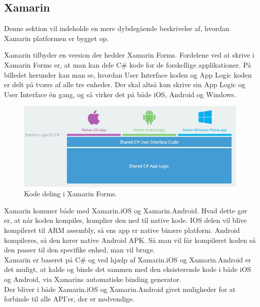 \subsection{Xamarin}
Denne sektion vil indeholde en mere dybdegående beskrivelse af, hvordan Xamarin platformen er bygget op.

Xamarin tilbyder en version der hedder Xamarin Forms. Fordelene ved at skrive i Xamarin Forms er, at man kan dele C\# kode for de forskellige applikationer.
På billedet herunder kan man se, hvordan User Interface koden og App Logic koden er delt på tværs af alle tre enheder. Der skal altså kun skrive sin App Logic og User Interface én gang, og så virker det på både iOS, Android og Windows.
\begin{figure}[H]
	\centering
	\includegraphics[width=1\linewidth]{Applikation/XarmarinShare.JPG}
	\caption{Kode deling i Xamarin Forms.\cite{Xarmain}}
	\label{fig:CodeShare}
\end{figure}

\clearpage

Xamarin kommer både med Xamarin.iOS og Xamarin.Android. Hvad dette gør er, at når koden kompiles, komplier den ned til native kode. IOS delen vil blive kompileret til ARM assembly, så ens app er native binære platform. Android kompileres, så den kører native Android APK. Så man vil får kompileret koden så den passer til den specifike enhed, man vil bruge. \\
Xamarin er baseret på C\# og ved hjælp af Xamarin.iOS og Xamarin.Android er det muligt, at kalde og binde det sammen med den eksisterende kode i både iOS og Android, via Xamarins automatiske binding generator. \\
Der bliver i både Xamarin.iOS og Xamarin.Android givet muligheder for at forbinde til alle API'er, der er nødvendige. \\

